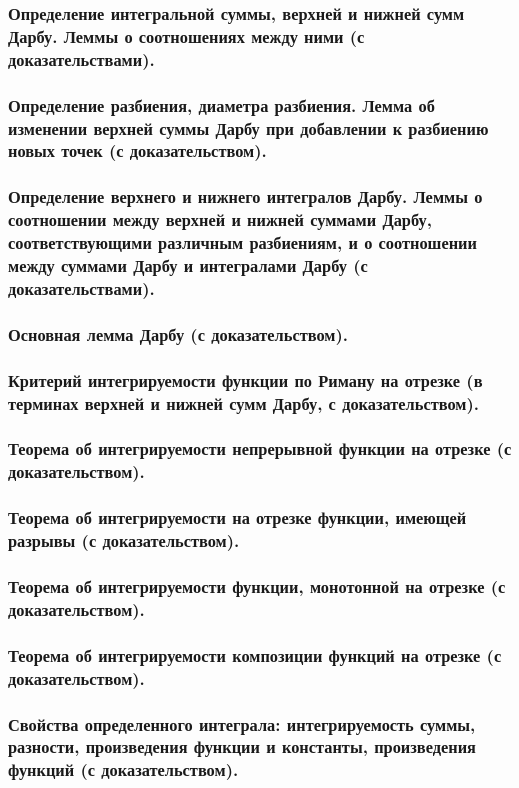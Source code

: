 \documentclass[10pt]{article}
\begin{document}
    \subsubsection{Определение интегральной суммы, верхней и нижней сумм Дарбу. Леммы о соотношениях между ними (с доказательствами).}
    \subsubsection{Определение разбиения, диаметра разбиения. Лемма об изменении верхней суммы Дарбу при добавлении к разбиению новых точек (с доказательством).}
    \subsubsection{Определение верхнего и нижнего интегралов Дарбу. Леммы о соотношении между верхней и нижней суммами Дарбу, соответствующими различным разбиениям, и о соотношении между суммами Дарбу и интегралами Дарбу (с доказательствами).}
    \subsubsection{Основная лемма Дарбу (с доказательством).}
    \subsubsection{Критерий интегрируемости функции по Риману на отрезке (в терминах верхней и нижней сумм Дарбу, с доказательством).}
    \subsubsection{Теорема об интегрируемости непрерывной функции на отрезке (с доказательством).}
    \subsubsection{Теорема об интегрируемости на отрезке функции, имеющей разрывы (с доказательством).}
    \subsubsection{Теорема об интегрируемости функции, монотонной на отрезке (с доказательством).}
    \subsubsection{Теорема об интегрируемости композиции функций на отрезке (с доказательством).}
    \subsubsection{Свойства определенного интеграла: интегрируемость суммы, разности, произведения функции и константы, произведения функций (с доказательством).}
\end{document}
